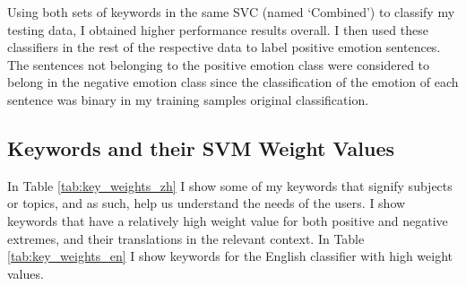 \documentclass[review]{elsarticle}
\begin{document}
Using both sets of keywords in the same SVC (named ‘Combined’) to classify my testing data, I obtained higher performance results overall. I then used these classifiers in the rest of the respective data to label positive emotion sentences. The sentences not belonging to the positive emotion class were considered to belong in the negative emotion class since the classification of the emotion of each sentence was binary in my training samples original classification.

\subsection{Keywords and their SVM Weight Values}\label{svmresults}

In Table \ref{tab:key_weights_zh} I show some of my keywords that signify subjects or topics, and as such, help us understand the needs of the users. I show keywords that have a relatively high weight value for both positive and negative extremes, and their translations in the relevant context. In Table \ref{tab:key_weights_en} I show keywords for the English classifier with high weight values.
\end{document}
